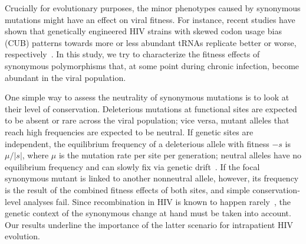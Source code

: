 \documentclass[12pt,a4paper,notitlepage,onecolumn]{article}
\newcommand{\mut}{\mu}
\begin{document}
Crucially for evolutionary purposes, the minor phenotypes caused by synonymous
mutations might have an effect on viral fitness. For instance, recent studies
have shown that genetically engineered HIV strains with skewed codon usage bias
(CUB) patterns towards more or less abundant tRNAs replicate better or worse,
respectively~\citep{ngumbela_quantitative_2008, li_codon-usage-based_2012}. In
this study, we try to characterize the fitness effects of synonymous
polymorphisms that, at some point during chronic infection, become abundant in
the viral population.

One simple way to assess the neutrality of synonymous mutations is to look at
their level of conservation. Deleterious mutations at functional sites are
expected to be absent or rare across the viral population; vice versa, mutant
alleles that reach high frequencies are expected to be neutral. If genetic sites
are independent, the equilibrium frequency of a deleterious allele with fitness
$-s$ is $\mut / |s|$, where $\mut$ is the mutation rate per site per generation;
neutral alleles have no equilibrium frequency and can slowly fix via genetic
drift~\citep{ewens_mathematical_2004}. If the focal synonymous mutant is linked
to another nonneutral allele, however, its frequency is the result of the
combined fitness effects of both sites, and simple conservation-level analyses
fail. Since recombination in HIV is known to happen
rarely~\citep{neher_recombination_2010, batorsky_estimate_2011}, the genetic
context of the synonymous change at hand must be taken into account. Our
results underline the importance of the latter scenario for intrapatient HIV
evolution.
\end{document}
